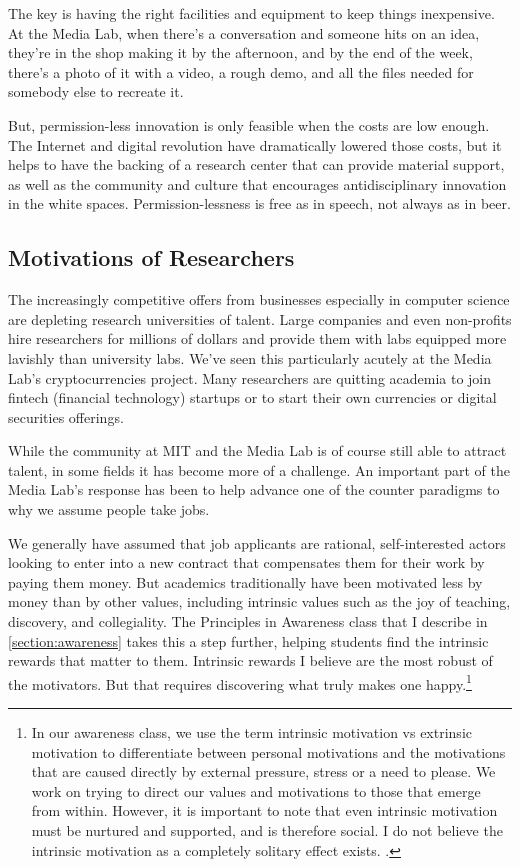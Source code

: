 The key is having the right facilities and equipment to keep things inexpensive. At the Media Lab, when there's a conversation and someone hits on an idea, they're in the shop making it by the afternoon, and by the end of the week, there's a photo of it with a video, a rough demo, and all the files needed for somebody else to recreate it. 

But, permission-less innovation is only feasible when the costs are low enough. The Internet and digital revolution have dramatically lowered those costs, but it helps to have the backing of a research center that can provide material support, as well as the community and culture that encourages antidisciplinary innovation in the white spaces. Permission-lessness is free as in speech, not always as in beer.

\subsection{Motivations of Researchers}

The increasingly competitive offers from businesses especially in computer science are depleting research universities of talent. Large companies and even non-profits hire researchers for millions of dollars and provide them with labs equipped more lavishly than university labs. We've seen this particularly acutely at the Media Lab's cryptocurrencies project. Many researchers are quitting academia to join fintech (financial technology) startups or to start their own currencies or digital securities offerings.

While the community at MIT and the Media Lab is of course still able to attract talent, in some fields it has become more of a challenge. An important part of the Media Lab's response has been to help advance one of the counter paradigms to why we assume people take jobs.

We generally have assumed that job applicants are rational, self-interested actors looking to enter into a new contract that compensates them for their work by paying them money. But academics traditionally have been motivated less by money than by other values, including intrinsic values such as the joy of teaching, discovery, and collegiality. The Principles in Awareness class that I describe in \autoref{section:awareness} takes this a step further, helping students find the intrinsic rewards that matter to them. Intrinsic rewards I believe are the most robust of the motivators. But that requires discovering what truly makes one happy.\footnote{In our awareness class, we use the term intrinsic motivation vs extrinsic motivation to differentiate between personal motivations and the motivations that are caused directly by external pressure, stress or a need to please. We work on trying to direct our values and motivations to those that emerge from within. However, it is important to note that even intrinsic motivation must be nurtured and supported, and is therefore social. I do not believe the intrinsic motivation as a completely solitary effect exists. \cite{ryan2000self}.}

